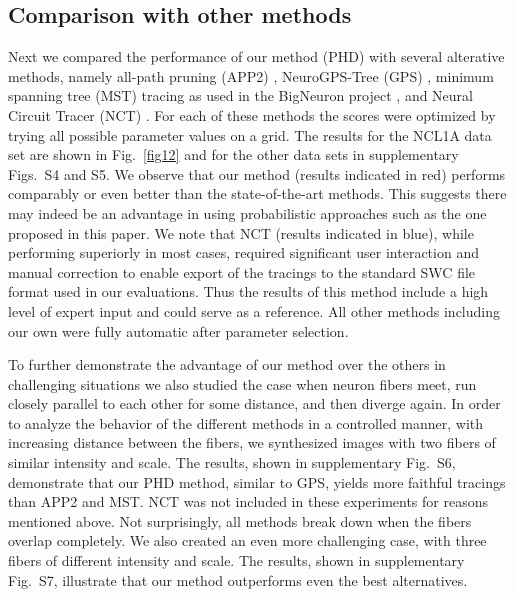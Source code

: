 \subsection{Comparison with other methods}
\label{subsec:comparison-with-other-methods}
Next we compared the performance of our method (PHD) with several alterative methods, namely all-path pruning (APP2) \cite{xiao2013app2}, NeuroGPS-Tree (GPS) \cite{quan2015neurogps}, minimum spanning tree (MST) tracing as used in the BigNeuron project \cite{Peng-2015}, and Neural Circuit Tracer (NCT) \cite{chothani2011automated}. For each of these methods the scores were optimized by trying all possible parameter values on a grid. The results for the NCL1A data set are shown in Fig.~\ref{fig12} and for the other data sets in supplementary Figs.~S4 and S5. We observe that our method (results indicated in red) performs comparably or even better than the state-of-the-art methods. This suggests there may indeed be an advantage in using probabilistic approaches such as the one proposed in this paper. We note that NCT (results indicated in blue), while performing superiorly in most cases, required significant user interaction and manual correction to enable export of the tracings to the standard SWC file format used in our evaluations. Thus the results of this method include a high level of expert input and could serve as a reference. All other methods including our own were fully automatic after parameter selection.


To further demonstrate the advantage of our method over the others in challenging situations we also studied the case when neuron fibers meet, run closely parallel to each other for some distance, and then diverge again. In order to analyze the behavior of the different methods in a controlled manner, with increasing distance between the fibers, we synthesized images with two fibers of similar intensity and scale. The results, shown in supplementary Fig.~S6, demonstrate that our PHD method, similar to GPS, yields more faithful tracings than APP2 and MST. NCT was not included in these experiments for reasons mentioned above. Not surprisingly, all methods break down when the fibers overlap completely. We also created an even more challenging case, with three fibers of different intensity and scale. The results, shown in supplementary Fig.~S7, illustrate that our method outperforms even the best alternatives.


